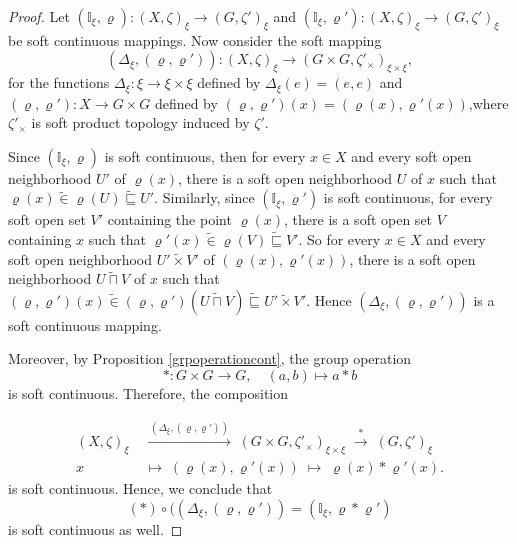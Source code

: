 \documentclass[10pt,a4paper]{amsart}
\begin{document}
\begin{proof}
Let \((\mathbb{I}_\xi , \varrho)\colon (X,\zeta)_\xi\to (G,\zeta')_\xi \) and
\((\mathbb{I}_\xi , \varrho')\colon (X,\zeta)_\xi\to (G,\zeta')_\xi\) be  soft continuous
mappings. Now consider the soft mapping $$(\Delta_\xi, (\varrho,\varrho') ):
(X,\zeta)_\xi\to (G\times G,\zeta'_\times)_{\xi\times \xi},$$  for the functions
$\Delta_\xi\colon \xi \to \xi\times \xi$ defined by $\Delta_\xi(e)=(e,e)$ and
$(\varrho,\varrho'):X \to G\times G$ defined by $(\varrho,\varrho')(x)=(\varrho(x),\varrho'(x))$,where
$\zeta'_\times$ is soft product topology induced by $\zeta'$.

Since
$(\mathbb{I}_\xi , \varrho)$ is soft continuous, then  for every \( x \in X\) and
every soft open neighborhood \( U' \) of \( \varrho(x) \),
there is a soft  open neighborhood \( U \) of \( x \) such that
\(
\varrho(x) \widetilde{\in}\varrho(U) \widetilde{\sqsubseteq} U'
\). Similarly, since $(\mathbb{I}_\xi , \varrho')$ is soft continuous, for every soft open set $V'$ containing the point $\varrho(x)$,
there is a soft open set $V$ containing $x$ such that $\varrho'(x) \widetilde{\in}\varrho(V) \widetilde{\sqsubseteq} V'$.  So   for every \( x \in X\) and every soft open neighborhood \( U'\widetilde{\times}V' \) of \( (\varrho(x),\varrho'(x)) \),
there is a soft  open neighborhood \( U\widetilde{\sqcap}V \) of \( x \) such that
\(
(\varrho,\varrho')(x) \widetilde{\in} (\varrho,\varrho')(U\widetilde{\sqcap}V) \widetilde{\sqsubseteq} U'\widetilde{\times}V'
\). Hence $(\Delta_\xi, (\varrho,\varrho') )$ is a soft continuous mapping.

Moreover, by Proposition \ref{grpoperationcont}, the group operation
\[
\ast\colon G\times G\to G, \quad (a,b)\mapsto a\ast b
\]
is soft continuous. Therefore, the composition

\[
\begin{aligned}
(X,\zeta)_\xi
&\;\xrightarrow{\,(\Delta_\xi, (\varrho,\varrho') )\,}\;
(G\times G,\zeta'_{\times})_{\xi\times \xi}
\;\xrightarrow{\;\ast\;}\;
(G,\zeta')_\xi   \\[6pt]
x\;&\;\longmapsto\;(\varrho(x),\varrho'(x))\;\longmapsto\;\varrho(x)\ast \varrho'(x).
\end{aligned}
\]
is soft continuous. Hence, we conclude that
\[
(\ast)\circ((\Delta_\xi , (\varrho , \varrho'))=(\mathbb{I}_\xi , \varrho\ast \varrho')
\]
is soft continuous as well.


\end{proof}
\end{document}
